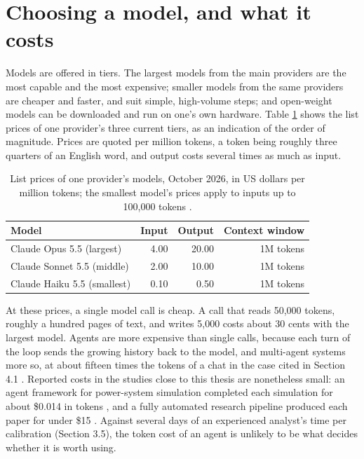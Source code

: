 \section{Choosing a model, and what it costs}

Models are offered in tiers.
The largest models from the main providers are the most capable and the most expensive; smaller models from the same providers are cheaper and faster, and suit simple, high-volume steps; and open-weight models can be downloaded and run on one's own hardware.
Table \ref{tab:model-prices} shows the list prices of one provider's three current tiers, as an indication of the order of magnitude.
Prices are quoted per million tokens, a token being roughly three quarters of an English word, and output costs several times as much as input.

\begin{table}[htbp]
\centering
\small
\caption{List prices of one provider's models, October 2026, in US dollars per million tokens; the smallest model's prices apply to inputs up to 100,000 tokens \citep{anthropic2026pricing}.}
\label{tab:model-prices}
\begin{tabularx}{\textwidth}{@{}Xrrr@{}}
\toprule
\textbf{Model} & \textbf{Input} & \textbf{Output} & \textbf{Context window} \\
\midrule
Claude Opus 5.5 (largest) & 4.00 & 20.00 & 1M tokens \\
Claude Sonnet 5.5 (middle) & 2.00 & 10.00 & 1M tokens \\
Claude Haiku 5.5 (smallest) & 0.10 & 0.50 & 1M tokens \\
\bottomrule
\end{tabularx}
\end{table}

At these prices, a single model call is cheap.
A call that reads 50,000 tokens, roughly a hundred pages of text, and writes 5,000 costs about 30 cents with the largest model.
Agents are more expensive than single calls, because each turn of the loop sends the growing history back to the model, and multi-agent systems more so, at about fifteen times the tokens of a chat in the case cited in Section 4.1 \citep{anthropic2025we}.
Reported costs in the studies close to this thesis are nonetheless small: an agent framework for power-system simulation completed each simulation for about \$0.014 in tokens \citep{jia2025enhancing}, and a fully automated research pipeline produced each paper for under \$15 \citep{lu2024ai}.
Against several days of an experienced analyst's time per calibration (Section 3.5), the token cost of an agent is unlikely to be what decides whether it is worth using.

